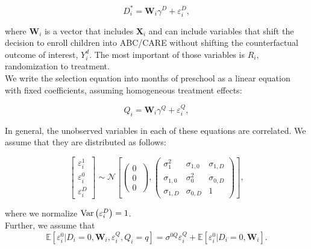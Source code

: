 \begin{appendices}
\begin{equation}
D^{*}_i = \mathbf{W}_i \gamma^{D} + \varepsilon^{D}_i, \label{eq:probitD}
\end{equation}

\noindent where $\mathbf{W}_i$ is a vector that includes $\mathbf{X}_i$ and can include variables that shift the decision to enroll children into ABC/CARE without shifting the counterfactual outcome of interest, $Y^{d}_{i}$. The most important of those variables is $R_i$, randomization to treatment.\\

\noindent We write the selection equation into months of preschool as a linear equation with fixed coefficients, assuming homogeneous treatment effects:

\begin{equation}
Q_i = \mathbf{W}_i \gamma^{Q} + \varepsilon^{Q}_i, \label{eq:selq}
\end{equation}

\noindent In general, the unobserved variables in each of these equations are correlated. We assume that they are distributed as follows: 

\begin{equation}
        \left[ \begin{array}{l}
        	 \varepsilon_{i}^1 \\
            \varepsilon_{i}^0 \\
            \varepsilon_{i}^D
        \end{array} \right]  \sim \mathcal{N} \left[ \left( \begin{array}{l}
        	 0 \\
           0 \\ 
           0
        \end{array} \ \right), 
                \left( \begin{array}{llll}
        	 \sigma_{1}^2 & \sigma_{1,0} & \sigma_{1,D}   \\
             \sigma_{1,0} & \sigma_{0}^2 & \sigma_{0,D}   \\
             \sigma_{1,D} & \sigma_{0,D} & 1 
        \end{array} \right) \right],  \label{eq:udist}
\end{equation}

\noindent where we normalize $\operatorname{Var} \left( \varepsilon^D_i \right) =1$.\\

\noindent Further, we assume that 
\begin{equation}
\mathbb{E}\left[\varepsilon_i^0|D_i=0,\mathbf{W}_i,\varepsilon^{Q}_i,Q_i=q\right]=\sigma^{0Q}\varepsilon^{Q}_i+\mathbb{E}\left[\varepsilon_i^0|D_i=0,\mathbf{W}_i\right].
\label{eq:E[epsilon0]}
\end{equation}


\end{appendices}
